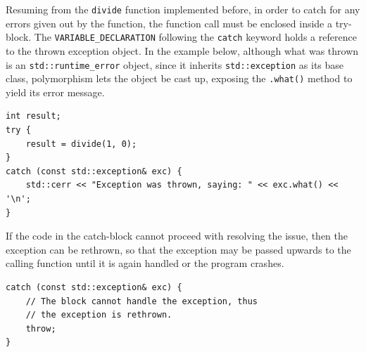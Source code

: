 \documentclass[12pt]{article}
\begin{document}
Resuming from the \texttt{divide} function implemented before, in order to catch for any errors given out by the function, the function call must be enclosed inside a try-block. The \texttt{VARIABLE\_DECLARATION} following the \texttt{catch} keyword holds a reference to the thrown exception object. In the example below, although what was thrown is an \texttt{std::runtime\_error} object, since it inherits \texttt{std::exception} as its base class, polymorphism lets the object be cast up, exposing the \texttt{.what()} method to yield its error message.

\begin{verbatim}
int result;
try {
    result = divide(1, 0);
}
catch (const std::exception& exc) {
    std::cerr << "Exception was thrown, saying: " << exc.what() << '\n';
}
\end{verbatim}

If the code in the catch-block cannot proceed with resolving the issue, then the exception can be rethrown, so that the exception may be passed upwards to the calling function until it is again handled or the program crashes.

\begin{verbatim}
catch (const std::exception& exc) {
    // The block cannot handle the exception, thus
    // the exception is rethrown.
    throw;
}
\end{verbatim}
\end{document}
